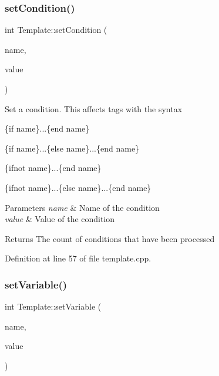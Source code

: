 \subsubsection{\texorpdfstring{set\+Condition()}{setCondition()}}
{\footnotesize\ttfamily int Template\+::set\+Condition (\begin{DoxyParamCaption}\item[{Q\+String}]{name,  }\item[{bool}]{value }\end{DoxyParamCaption})}

Set a condition. This affects tags with the syntax


\begin{DoxyItemize}
\item \{if name\}...\{end name\}
\item \{if name\}...\{else name\}...\{end name\}
\item \{ifnot name\}...\{end name\}
\item \{ifnot name\}...\{else name\}...\{end name\}
\end{DoxyItemize}


\begin{DoxyParams}{Parameters}
{\em name} & Name of the condition \\
\hline
{\em value} & Value of the condition \\
\hline
\end{DoxyParams}
\begin{DoxyReturn}{Returns}
The count of conditions that have been processed 
\end{DoxyReturn}


Definition at line 57 of file template.\+cpp.

\mbox{\label{classstefanfrings_1_1_template_abd87f7c267c6e047b5db8c0d50c2eea4}} 
\subsubsection{\texorpdfstring{set\+Variable()}{setVariable()}}
{\footnotesize\ttfamily int Template\+::set\+Variable (\begin{DoxyParamCaption}\item[{Q\+String}]{name,  }\item[{Q\+String}]{value }\end{DoxyParamCaption})}

